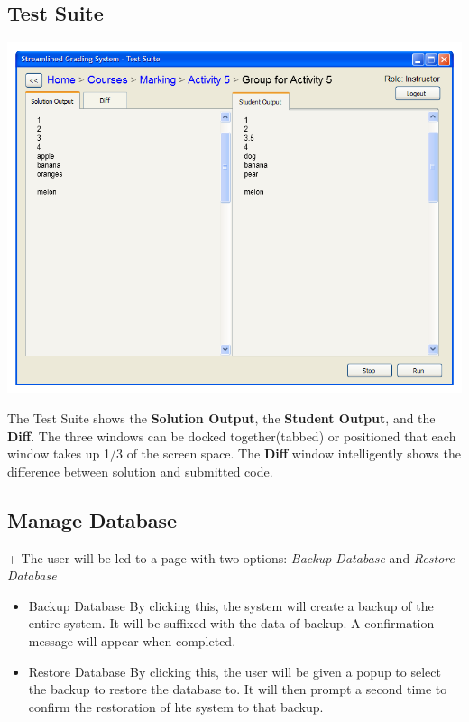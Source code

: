 \documentclass{article}
\begin{document}
\subsection{Test Suite}
\begin{center}
\includegraphics[scale=0.6]{../images/UIMockups/PNG_Renders/SRS_TestSuite_Split}
\end{center}
The Test Suite shows the \textbf{Solution Output}, the \textbf{Student Output}, and the \textbf{Diff}.  
The three windows can be docked together(tabbed) or positioned that each
window takes up 1/3 of the screen space.
The \textbf{Diff} window intelligently shows the difference between
solution and submitted code.

\subsection{Manage Database}
+%
The user will be led to a page with two options: \emph{Backup Database} and \emph{Restore Database}
\begin{itemize}
  \item Backup Database
By clicking this, the system will create a backup of the entire system. It will be suffixed with the data of backup. A confirmation message will appear when completed.
  \item Restore Database
By clicking this, the user will be given a popup to select the backup to restore the database to. It will then prompt a second time to confirm the restoration of hte system to that backup.
\end{itemize}
\end{document}
